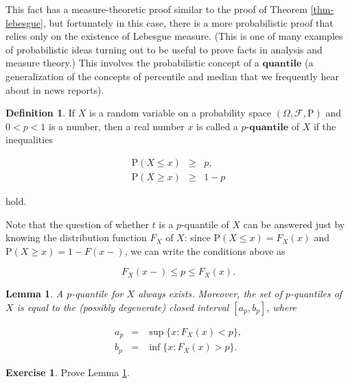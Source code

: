 \documentclass[11pt]{report}
\providecommand{\cal}{\mathcal}
\theoremstyle{plain}
\newtheorem{lem}[thm]{Lemma}
\theoremstyle{definition}
\newtheorem{defn}[thm]{Definition}
\newtheorem{xexercise}[thm]{Exercise}
\begin{document}
This fact has a measure-theoretic proof similar to
the proof of Theorem \ref{thm-lebesgue}, but fortunately
in this case, there is a more probabilistic proof that
relies only on the existence of Lebesgue measure.
(This is one of many examples of probabilistic ideas
turning out to be useful to prove facts in analysis
and measure theory.) This involves the probabilistic
concept of a $\textbf{quantile}$ (a generalization of
the concepts of percentile and median that we
frequently hear about in news reports).

\begin{defn}
If $X$ is a random variable on a probability space
$(\Omega, {\cal F}, \mathrm{P})$ and $0<p<1$ is a
number, then a real number $x$ is called a $\textbf{$p
$-quantile}$ of $X$ if the inequalities

\begin{eqnarray*}
\mathrm{P}(X \le x) &\ge& p, \\
\mathrm{P}(X \ge x) & \ge & 1-p
\end{eqnarray*}

hold.
\end{defn}

Note that the question of whether $t$ is a
$p$-quantile of $X$ can be answered just by knowing
the distribution function $F_X$ of $X$: since
$\mathrm{P}(X\le x)=F_X(x)$ and
$\mathrm{P}(X\ge x)=1-F(x-)$, we can write the
conditions above as

\[
F_X(x-) \le p \le F_X(x).
\]

\begin{lem}
\label{lem-quantile}
A $p$-quantile for $X$ always exists. Moreover, the
set of $p$-quantiles of $X$ is equal to the (possibly
degenerate) closed interval $[a_p, b_p]$, where

\begin{eqnarray*}
a_p &=& \sup \{ x : F_X(x) < p \}, \\
b_p &=& \inf \{ x : F_X(x) > p \}.
\end{eqnarray*}

\end{lem}

\begin{xexercise}
Prove Lemma \ref{lem-quantile}.
\end{xexercise}
\end{document}
